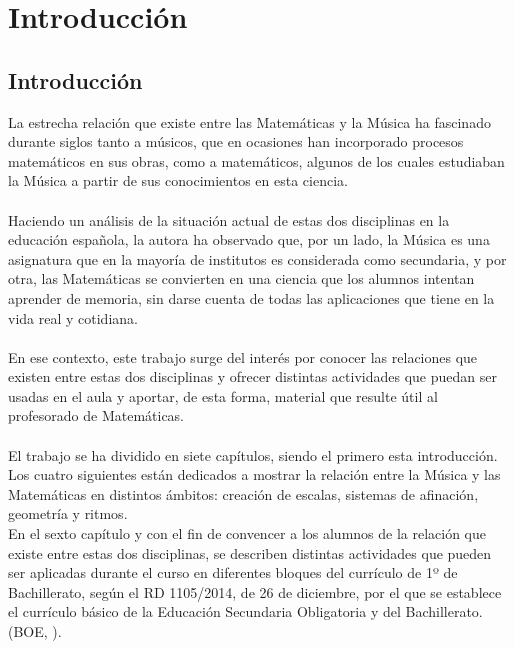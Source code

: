 \documentclass[a4paper, openright, 11pt, titlepage]{report}
\theoremstyle{definition}\newtheorem{defin}[propo]{Definition}
\theoremstyle{definition}\newtheorem{obser}[propo]{Remark}
\theoremstyle{definition}\newtheorem{ejem}[propo]{Ejemplo}
\theoremstyle{definition}\newtheorem{algoritmo}[propo]{Algoritmo}
\begin{document}
\tableofcontents %

\cleardoublepage
{} %
\listoffigures %

\cleardoublepage
{} %
\listoftables %
\newpage
\chapter{Introducción}
\section{Introducción}
\pagestyle{fancy}
\fancyhf{}
\rhead[\textit{\rightmark}]{\textit{\rightmark}}
\cfoot{\thepage}
La estrecha relación que existe entre las Matemáticas y la Música ha fascinado durante siglos tanto a músicos, que en ocasiones han incorporado procesos matemáticos en sus obras, como a matemáticos, algunos de los cuales estudiaban la Música a partir de sus conocimientos en esta ciencia.\\\\
Haciendo un análisis de la situación actual de estas dos disciplinas en la educación española, la autora ha observado que, por un lado, la Música es una asignatura que en la mayoría de institutos es considerada como secundaria, y por otra, las Matemáticas se convierten en una ciencia que los alumnos intentan aprender de memoria, sin darse cuenta de todas las aplicaciones que tiene en la vida real y cotidiana.\\\\
En ese contexto, este trabajo surge del interés por conocer las relaciones que existen entre estas dos disciplinas y ofrecer distintas actividades que puedan ser usadas en el aula y aportar, de esta forma, material que resulte útil al profesorado de Matemáticas.\\\\
El trabajo se ha dividido en siete capítulos, siendo el primero esta introducción. Los cuatro siguientes están dedicados a mostrar la relación entre la Música y las Matemáticas en distintos ámbitos: creación de escalas, sistemas de afinación, geometría y ritmos.\\
En el sexto capítulo y con el fin de convencer a los alumnos de la relación que existe entre estas dos disciplinas, se describen distintas actividades que pueden ser aplicadas durante el curso en diferentes bloques del currículo de 1º de Bachillerato, según el RD 1105/2014, de 26 de diciembre, por el que se establece el currículo básico de la Educación Secundaria Obligatoria y del Bachillerato. (BOE, \cite{boe}).\\\\
\end{document}
